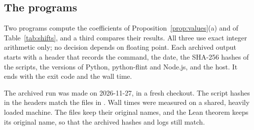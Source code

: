 \documentclass[11pt]{amsart}
\theoremstyle{definition}
\theoremstyle{remark}
\begin{document}
\subsection*{The programs}
Two programs compute the coefficients of Proposition~\ref{prop:values}(a) and of Table~\ref{tab:shifts}, and a third compares their results. All three use exact integer arithmetic only; no decision depends on floating point. Each archived output starts with a header that records the command, the date, the SHA-256 hashes of the scripts, the versions of Python, python-flint and Node.js, and the host. It ends with the exit code and the wall time.

The archived run was made on 2026-11-27, in a fresh checkout. The script hashes in the headers match the files in . Wall times were measured on a shared, heavily loaded machine. The files keep their original names, and the Lean theorem keeps its original name, so that the archived hashes and logs still match.
\end{document}
